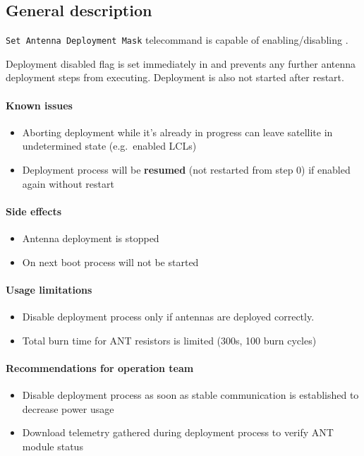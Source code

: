 

\subsection{General description}
\texttt{Set Antenna Deployment Mask} telecommand is capable of enabling/disabling .

Deployment disabled flag is set immediately in  and prevents any further antenna deployment steps from executing. Deployment is also not started after \OBC restart.

\paragraph{Known issues}
\begin{itemize}
	\item Aborting deployment while it's already in progress can leave satellite in undetermined state (e.g.\ enabled LCLs)
	\item Deployment process will be \textbf{resumed} (not restarted from step 0) if enabled again without \OBC restart
\end{itemize}

\paragraph{Side effects}
\begin{itemize}
	\item Antenna deployment is stopped
	\item On next \OBC boot process will not be started
\end{itemize}

\paragraph{Usage limitations} 
\begin{itemize}
	\item Disable deployment process only if antennas are deployed correctly. 
	\item Total burn time for ANT resistors is limited (300s, 100 burn cycles)
\end{itemize}

\paragraph{Recommendations for operation team} 
\begin{itemize}
	\item Disable deployment process as soon as stable communication is established to decrease power usage
	\item Download telemetry gathered during deployment process to verify ANT module status
\end{itemize}

